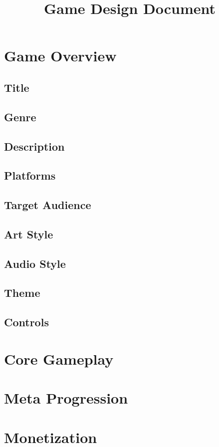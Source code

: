 \documentclass[10pt, a4paper]{article}
\title{Game Design Document}
\author{}
\date{}
\begin{document}
	\maketitle
	\tableofcontents
	\pagebreak
	
	\section{Game Overview}
	\subsection{Title} 
	\subsection{Genre} 
	\subsection{Description}
	\subsection{Platforms} 
	\subsection{Target Audience}
	\subsection{Art Style} 
	\subsection{Audio Style} 
	\subsection{Theme} 
	\subsection{Controls} 
	
	\section{Core Gameplay}
	\section{Meta Progression}
	\section{Monetization}
\end{document}
